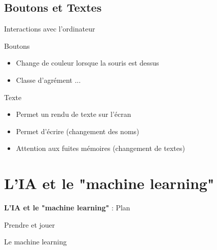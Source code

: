 \documentclass[c,12pt]{beamer}
\begin{document}
	\subsection{Boutons et Textes}
\begin{frame}{Interactions avec l'ordinateur}
	\onslide<2-> {
	\begin{block}{Boutons}
		\begin{itemize}
			\item Change de couleur lorsque la souris est dessus
			\item Classe d'agrément ...
		\end{itemize}
	\end{block}}
	 {
	\begin{block}{Texte}
		\begin{itemize}
			\item Permet un rendu de texte sur l'écran
			\item Permet d'écrire (changement des noms)
			\item Attention aux fuites mémoires (changement de textes)
		\end{itemize}
	\end{block}}
\end{frame}	

\section{L'IA et le "machine learning"}
\begin{frame}{\textbf{L'IA et le "machine learning"} : Plan}
\begin{itemize}
	 {\item Prendre et jouer}
	\newline
	 {\item Le machine learning}
\end{itemize}
\end{frame}
\end{document}
